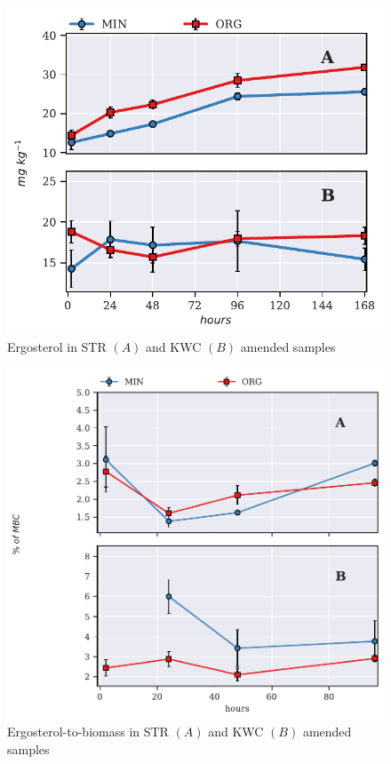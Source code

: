 \documentclass[12pt]{report}
\newcommand{\ScalePreTreated}{1.2}
\begin{document}
		 \begin{figure}[H]
			\centering
			\includegraphics[scale=\ScalePreTreated]{thesis_figures/preliminary/treated/Erg.pdf}
			\caption{Ergosterol in STR $\left(A\right)$ and KWC $\left(B\right)$ amended   samples}
			\label{fig:erg_treated_preliminary}
		\end{figure}
	
		\begin{figure}[H]
			\centering
			\includegraphics[scale=\ScalePreTreated]{thesis_figures/preliminary/treated/Erg-to-MBC.pdf}
			\caption{Ergosterol-to-biomass in STR $\left(A\right)$ and KWC $\left(B\right)$ amended   samples}
			\label{fig:erg_to_mbc_treated_preliminary}
		\end{figure}
		
\end{document}
